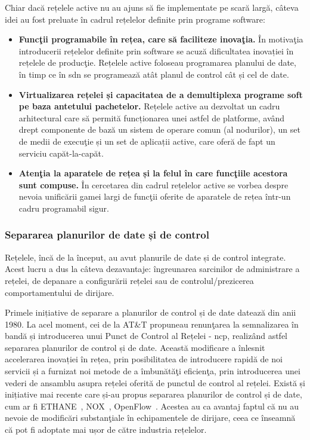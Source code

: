 Chiar dacă rețelele active nu au ajuns să fie implementate pe scară largă, câteva idei au fost preluate în cadrul rețelelor definite prin programe software:
\begin{itemize}
\item \textbf{Funcţii programabile în rețea, care să faciliteze inovaţia.} În motivaţia introducerii rețelelor definite prin software se acuză dificultatea inovației în rețelele de producţie. Rețelele active foloseau programarea planului de date, în timp ce în \gls{sdn} se programează atât planul de control cât și cel de date.
\item \textbf{Virtualizarea rețelei și capacitatea de a demultiplexa programe soft pe baza antetului pachetelor.} Rețelele active au dezvoltat un cadru arhitectural care să permită funcționarea unei astfel de platforme, având drept componente de bază un sistem de operare comun (al nodurilor), un set de medii de execuţie și un set de aplicații active, care oferă de fapt un serviciu capăt-la-capăt.
\item \textbf{Atenţia la aparatele de rețea și la felul în care funcţiile acestora sunt compuse.} În cercetarea din cadrul rețelelor active se vorbea despre nevoia unificării gamei largi de funcţii oferite de aparatele de rețea într-un cadru programabil sigur.
\end{itemize}

\subsubsection{Separarea planurilor de date și de control}

Rețelele, încă de la început, au avut planurile de date și de control integrate. Acest lucru a dus la câteva dezavantaje: îngreunarea sarcinilor de administrare a rețelei, de depanare a configurării rețelei sau de controlul/prezicerea comportamentului de dirijare.

Primele inițiative de separare a planurilor de control și de date datează din anii 1980. La acel moment, cei de la AT\&T propuneau renunţarea la semnalizarea în bandă și introducerea unui Punct de Control al Rețelei - \gls{ncp}, realizând astfel separarea planurilor de control și de date. Această modificare a înlesnit accelerarea inovației în rețea, prin posibilitatea de introducere rapidă de noi servicii și a furnizat noi metode de a îmbunătăţi eficienţa, prin introducerea unei vederi de ansamblu asupra rețelei oferită de punctul de control al rețelei. Există și inițiative mai recente care și-au propus separarea planurilor de control și de date, cum ar fi ETHANE~\cite{casado2007ethane}, NOX~\cite{gude2008nox}, OpenFlow~\cite{mckeown2008openflow}. Acestea au ca avantaj faptul că nu au nevoie de modificări substanţiale în echipamentele de dirijare, ceea ce înseamnă că pot fi adoptate mai ușor de către industria rețelelor.

